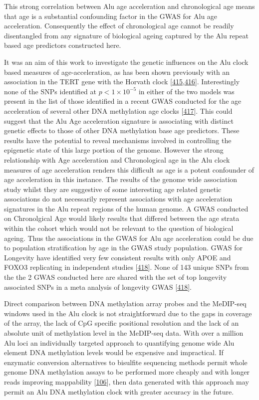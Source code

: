 \documentclass[
]{book}
\begin{document}
This strong correlation between Alu age acceleration and chronological age means that age is a substantial confounding factor in the GWAS for Alu age acceleration.
Consequently the effect of chronological age cannot be readily disentangled from any signature of biological ageing captured by the Alu repeat based age predictors constructed here.

It was an aim of this work to investigate the genetic influences on the Alu clock based measures of age-acceleration, as has been shown previously with an association in the TERT gene with the Horvath clock {[}\protect\hyperlink{ref-Lu2017}{415},\protect\hyperlink{ref-Gibson2019}{416}{]}.
Interestingly none of the SNPs identified at \(p < 1\times10^{-5}\) in either of the two models was present in the list of those identified in a recent GWAS conducted for the age acceleration of several other DNA methylation age clocks {[}\protect\hyperlink{ref-Mccartney2020}{417}{]}.
This could suggest that the Alu Age acceleration signature is associating with distinct genetic effects to those of other DNA methylation base age predictors.
These results have the potential to reveal mechanisms involved in controlling the epigenetic state of this large portion of the genome.
However the strong relationship with Age acceleration and Chronological age in the Alu clock measures of age acceleration renders this difficult as age is a potent confounder of age acceleration in this instance.
The results of the genome wide association study whilst they are suggestive of some interesting age related genetic associations do not necessarily represent associations with age acceleration signatures in the Alu repeat regions of the human genome.
A GWAS conducted on Chronolgical Age would likely results that differed between the age strata within the cohort which would not be relevant to the question of biological ageing.
Thus the associations in the GWAS for Alu age acceleration could be due to population stratification by age in the GWAS study population.
GWAS for Longevity have identified very few consistent results with only APOE and FOXO3 replicating in independent studies {[}\protect\hyperlink{ref-Broer2015}{418}{]}.
None of 143 unique SNPs from the the 2 GWAS conducted here are shared with the set of top longevity associated SNPs in a meta analysis of longevity GWAS {[}\protect\hyperlink{ref-Broer2015}{418}{]}.

Direct comparison between DNA methylation array probes and the MeDIP-seq windows used in the Alu clock is not straightforward due to the gaps in coverage of the array, the lack of CpG specific positional resolution and the lack of an absolute unit of methylation level in the MeDIP-seq data.
With over a million Alu loci an individually targeted approach to quantifying genome wide Alu element DNA methylation levels would be expensive and impractical.
If enzymatic conversion alternatives to bisulfite sequencing methods permit whole genome DNA methylation assays to be performed more cheaply and with longer reads improving mappability {[}\protect\hyperlink{ref-Williams2019}{106}{]}, then data generated with this approach may permit an Alu DNA methylation clock with greater accuracy in the future.
\end{document}
